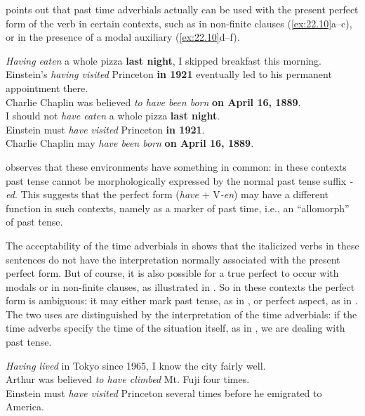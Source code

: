 \citet[55]{Comrie1976} points out that past time adverbials actually can be used with the present perfect form of the verb in certain contexts, such as in non-finite clauses (\ref{ex:22.10}a--c), or in the presence of a modal auxiliary (\ref{ex:22.10}d--f).


\ea \label{ex:22.10}
\ea \textit{Having eaten} a whole pizza \textbf{last night}, I skipped breakfast this morning.\\
\ex Einstein’s \textit{having visited} Princeton \textbf{in 1921} eventually led to his permanent appointment there.\\
\ex Charlie Chaplin was believed \textit{to have been born} \textbf{on April 16, 1889}.\\
\ex I should not \textit{have eaten} a whole pizza \textbf{last night}.\\
\ex Einstein must \textit{have visited} Princeton \textbf{in 1921}.\\
\ex Charlie Chaplin may \textit{have been born} \textbf{on April 16, 1889}.
                       \z
\z


\citet[101]{McCawley1971} observes that these environments have something in common: in these contexts past tense cannot be morphologically expressed by the normal past tense suffix \textit{-ed}. This suggests that the perfect form (\textit{have} + V\textit{-en}) may have a different function in such contexts, namely as a marker of past time, i.e., an “allomorph” of past tense.



The acceptability of the time adverbials in  shows that the italicized verbs in these sentences do not have the interpretation normally associated with the present perfect form. But of course, it is also possible for a true perfect to occur with modals or in non-finite clauses, as illustrated in . So in these contexts the perfect form is ambiguous: it may either mark past tense, as in , or perfect aspect, as in . The two uses are distinguished by the interpretation of the time adverbials: if the time adverbs specify the time of the situation itself, as in , we are dealing with past tense.


\newpage %
\ea \label{ex:22.11}
\ea \textit{Having lived} in Tokyo since 1965, I know the city fairly well.\\
\ex Arthur was believed \textit{to have climbed} Mt. Fuji four times.\\
\ex Einstein must \textit{have visited} Princeton several times before he emigrated to America.
                       \z
\z


